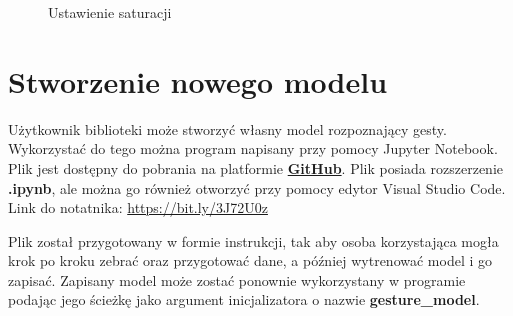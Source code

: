 \begin{figure}[H]
    \centering
    \hfill
    \caption{Ustawienie saturacji}
\end{figure}


\section{Stworzenie nowego modelu}

\quad Użytkownik biblioteki może stworzyć własny model rozpoznający gesty. Wykorzystać do tego można program napisany przy pomocy Jupyter Notebook. Plik jest dostępny do pobrania na platformie \href{https://bit.ly/3J72U0z}{\textbf{GitHub}}. Plik posiada rozszerzenie \textbf{.ipynb}, ale można go również otworzyć przy pomocy edytor Visual Studio Code. Link do notatnika: \href{https://bit.ly/3J72U0z}{https://bit.ly/3J72U0z}

\quad Plik został przygotowany w formie instrukcji, tak aby osoba korzystająca mogła krok po kroku zebrać oraz przygotować dane, a później wytrenować model i go zapisać. Zapisany model może zostać ponownie wykorzystany w programie podając jego ścieżkę jako argument inicjalizatora o nazwie \textbf{gesture\_model}.

